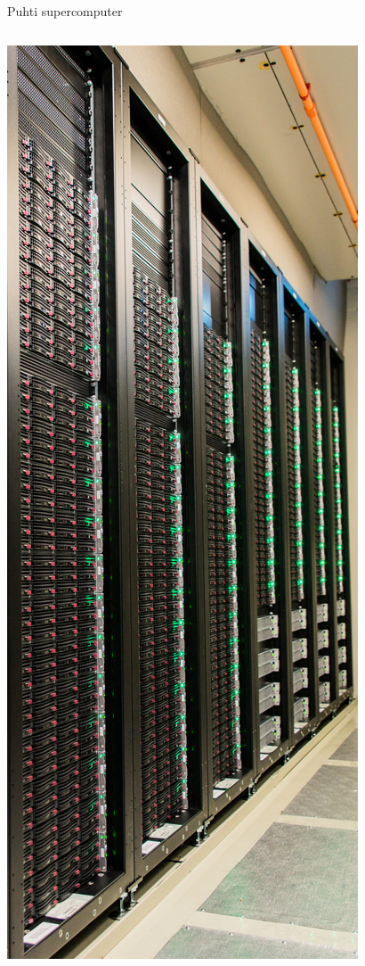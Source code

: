 \documentclass[aspectratio=1610,14pt]{beamer}
\begin{document}
\begin{frame}{Puhti supercomputer}
\begin{columns}
\begin{column}{0.24\linewidth}
      \includegraphics[height=0.8\textheight]{puhti-long}
    \end{column}
  \end{columns}
\end{frame}
\end{document}
